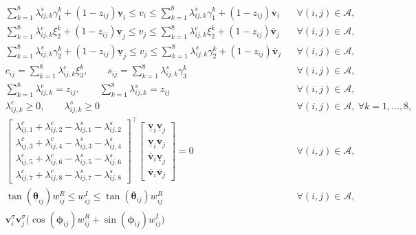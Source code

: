 \documentclass{article}
\begin{document}
\begin{equation}
\begin{aligned}
& \sum_{k=1}^{8} \lambda_{ij,k}^s \gamma_1^k + (1-z_{ij})\underline{\boldsymbol{v}}_i
\le v_i \le
\sum_{k=1}^{8} \lambda_{ij,k}^s \gamma_1^k + (1-z_{ij})\overline{\boldsymbol{v}}_i
&& \forall (i,j)\in\mathcal{A}, \\
& \sum_{k=1}^{8} \lambda_{ij,k}^c \xi_2^k + (1-z_{ij})\underline{\boldsymbol{v}}_j
\le v_j \le
\sum_{k=1}^{8} \lambda_{ij,k}^c \xi_2^k + (1-z_{ij})\overline{\boldsymbol{v}}_j
&& \forall (i,j)\in\mathcal{A}, \\
& \sum_{k=1}^{8} \lambda_{ij,k}^s \gamma_2^k + (1-z_{ij})\underline{\boldsymbol{v}}_j
\le v_j \le
\sum_{k=1}^{8} \lambda_{ij,k}^s \gamma_2^k + (1-z_{ij})\overline{\boldsymbol{v}}_j
&& \forall (i,j)\in\mathcal{A}, \\
& c_{ij} = \sum_{k=1}^{8} \lambda_{ij,k}^c \xi_3^k,\qquad
s_{ij} = \sum_{k=1}^{8} \lambda_{ij,k}^s \gamma_3^k
&& \forall (i,j)\in\mathcal{A}, \\
& \sum_{k=1}^{8} \lambda_{ij,k}^c = z_{ij},\qquad
\sum_{k=1}^{8} \lambda_{ij,k}^s = z_{ij}
&& \forall (i,j)\in\mathcal{A}, \\
& \lambda_{ij,k}^c \ge 0,\qquad \lambda_{ij,k}^s \ge 0
&& \forall (i,j)\in\mathcal{A},\ \forall k=1,\dots,8, \\
&
\begin{bmatrix}
\lambda_{ij,1}^c+\lambda_{ij,2}^c-\lambda_{ij,1}^s-\lambda_{ij,2}^s \\
\lambda_{ij,3}^c+\lambda_{ij,4}^c-\lambda_{ij,3}^s-\lambda_{ij,4}^s \\
\lambda_{ij,5}^c+\lambda_{ij,6}^c-\lambda_{ij,5}^s-\lambda_{ij,6}^s \\
\lambda_{ij,7}^c+\lambda_{ij,8}^c-\lambda_{ij,7}^s-\lambda_{ij,8}^s
\end{bmatrix}^{\top}
\begin{bmatrix}
\underline{\boldsymbol{v}}_i\underline{\boldsymbol{v}}_j \\
\underline{\boldsymbol{v}}_i\overline{\boldsymbol{v}}_j \\
\overline{\boldsymbol{v}}_i\underline{\boldsymbol{v}}_j \\
\overline{\boldsymbol{v}}_i\overline{\boldsymbol{v}}_j
\end{bmatrix}
= 0
&& \forall (i,j)\in\mathcal{A}, \\
& \tan(\underline{\boldsymbol{\theta}}_{ij}) w_{ij}^R \le w_{ij}^I \le \tan(\overline{\boldsymbol{\theta}}_{ij}) w_{ij}^R
&& \forall (i,j)\in\mathcal{A}, \\
& \boldsymbol{v}_i^\sigma \boldsymbol{v}_j^\sigma \bigl(\cos(\boldsymbol{\phi}_{ij}) w_{ij}^R + \sin(\boldsymbol{\phi}_{ij}) w_{ij}^I\bigr)

\end{aligned}
\end{equation}
\end{document}
